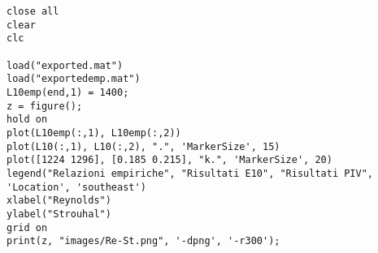 \begin{lstlisting}[style=Matlab-editor, basicstyle=\ttfamily\footnotesize]
%% Confronto Reynolds-Strouhal
close all
clear
clc

load("exported.mat")
load("exportedemp.mat")
L10emp(end,1) = 1400; 
z = figure();
hold on
plot(L10emp(:,1), L10emp(:,2))
plot(L10(:,1), L10(:,2), ".", 'MarkerSize', 15)
plot([1224 1296], [0.185 0.215], "k.", 'MarkerSize', 20)
legend("Relazioni empiriche", "Risultati E10", "Risultati PIV", 'Location', 'southeast')
xlabel("Reynolds")
ylabel("Strouhal")
grid on
print(z, "images/Re-St.png", '-dpng', '-r300');
\end{lstlisting}
